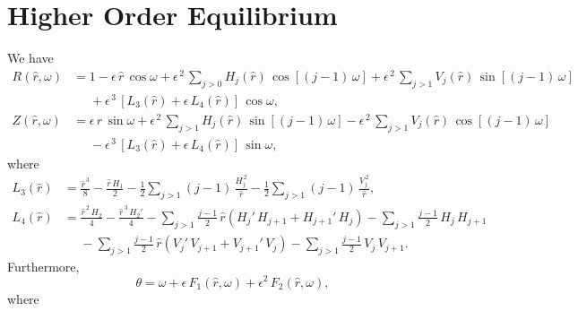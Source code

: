 \documentclass[12pt,prb,aps]{revtex4-1}
\begin{document}
\section{Higher Order Equilibrium}
We have 
\begin{align}
R(\hat{r},\omega) &= 1 -\epsilon\,\hat{r}\,\cos\omega + \epsilon^{\,2}\,\sum_{j>0}H_j(\hat{r})\,\cos[(j-1)\,\omega] + \epsilon^{\,2}\,\sum_{j>1}V_j(\hat{r})\,\sin[(j-1)\,\omega] \nonumber\\[0.5ex]
&\phantom{=}+\epsilon^{\,3}\,[L_3(\hat{r})+\epsilon\,L_4(\hat{r})]\,\cos\omega,\\[0.5ex]
Z(\hat{r},\omega)&= \epsilon\,\hat{r}\,\sin\omega +\epsilon^{\,2}\,\sum_{j>1}H_j(\hat{r})\,\sin[(j-1)\,\omega]
-\epsilon^{\,2}\,\sum_{j>1}V_j(\hat{r})\,\cos[(j-1)\,\omega]\nonumber\\[0.5ex]&\phantom{=}-
\epsilon^{\,3}\,[L_3(\hat{r})+\epsilon\,L_4(\hat{r})]\,\sin\omega,
\end{align}
where
\begin{align}
L_3(\hat{r})&= \frac{\hat{r}^{\,3}}{8} -\frac{\hat{r}\,H_1}{2}-\frac{1}{2}\sum_{j>1}(j-1)\,\frac{H_j^{\,2}}{\hat{r}}
-\frac{1}{2}\sum_{j>1}(j-1)\,\frac{V_j^{\,2}}{\hat{r}},\\[0.5ex]
L_4(\hat{r})&=\frac{\hat{r}^{\,2}\,H_2}{4}  - \frac{\hat{r}^{\,3}\,H_2'}{4}
-\sum_{j>1}\frac{j-1}{2}\,\hat{r}\left(H_j'\,H_{j+1}+H_{j+1}'\,H_j\right) - \sum_{j>1}\frac{j-1}{2}\,H_j\,H_{j+1}\nonumber\\[0.5ex]
&\phantom{=}-\sum_{j>1}\frac{j-1}{2}\,\hat{r}\left(V_j'\,V_{j+1}+V_{j+1}'\,V_j\right) - \sum_{j>1}\frac{j-1}{2}\,V_j\,V_{j+1}.
\end{align}
Furthermore,
\begin{equation}
\theta =\omega + \epsilon\,F_1(\hat{r},\omega) + \epsilon^2\,F_2(\hat{r},\omega),
\end{equation}
where
\end{document}
